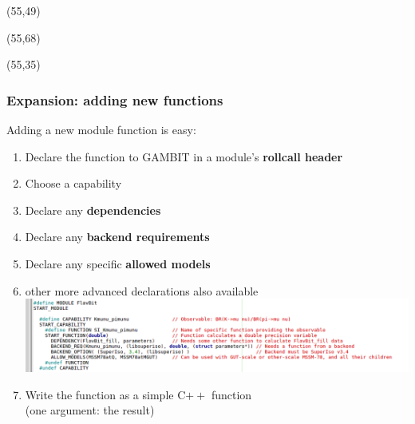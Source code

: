 \documentclass[xcolor=dvipsnames]{beamer}
\begin{document}
\begin{frame}
\begin{textblock}{20}(55,49)
  {
  }
\end{textblock}

\begin{textblock}{20}(55,68)
  {
  }
\end{textblock}

\begin{textblock}{20}(55,35)
  {
  }
\end{textblock}

\end{frame}

\begin{frame}
\frametitle{Expansion: adding new functions}

Adding a new module function is easy:
\begin{enumerate}
\item Declare the function to GAMBIT in a module's \textbf{rollcall header}\bi
  \item Choose a capability
  \item Declare any \textbf{dependencies}
  \item Declare any \textbf{backend requirements}
  \item Declare any specific \textbf{allowed models}
  \item other more advanced declarations also available
\ei
\includegraphics[width=\textwidth]{rollcallshot}
\item Write the function as a simple C$++$ function\\(one argument: the result)
\end{enumerate}


\end{frame}
\end{document}
